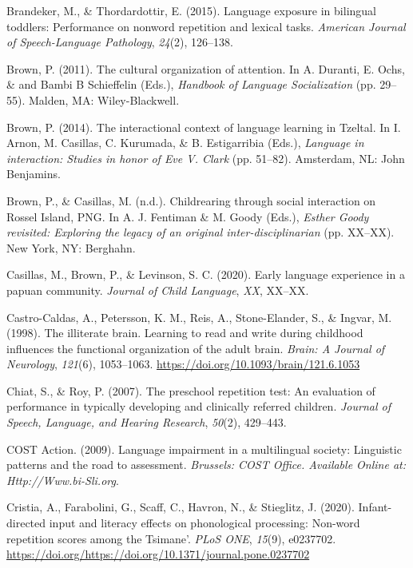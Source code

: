 \documentclass[english,,man,floatsintext]{apa6}
\begin{document}
\leavevmode\hypertarget{ref-brandeker2015language}{}%
Brandeker, M., \& Thordardottir, E. (2015). Language exposure in bilingual toddlers: Performance on nonword repetition and lexical tasks. \emph{American Journal of Speech-Language Pathology}, \emph{24}(2), 126--138.

\leavevmode\hypertarget{ref-brown2011cultural}{}%
Brown, P. (2011). The cultural organization of attention. In A. Duranti, E. Ochs, \& and Bambi B Schieffelin (Eds.), \emph{Handbook of Language Socialization} (pp. 29--55). Malden, MA: Wiley-Blackwell.

\leavevmode\hypertarget{ref-brown2014interactional}{}%
Brown, P. (2014). The interactional context of language learning in Tzeltal. In I. Arnon, M. Casillas, C. Kurumada, \& B. Estigarribia (Eds.), \emph{Language in interaction: Studies in honor of Eve V. Clark} (pp. 51--82). Amsterdam, NL: John Benjamins.

\leavevmode\hypertarget{ref-brownIPchildrearing}{}%
Brown, P., \& Casillas, M. (n.d.). Childrearing through social interaction on Rossel Island, PNG. In A. J. Fentiman \& M. Goody (Eds.), \emph{Esther Goody revisited: Exploring the legacy of an original inter-disciplinarian} (pp. XX--XX). New York, NY: Berghahn.

\leavevmode\hypertarget{ref-casillas2020early}{}%
Casillas, M., Brown, P., \& Levinson, S. C. (2020). Early language experience in a papuan community. \emph{Journal of Child Language}, \emph{XX}, XX--XX.

\leavevmode\hypertarget{ref-castro1998illiterate}{}%
Castro-Caldas, A., Petersson, K. M., Reis, A., Stone-Elander, S., \& Ingvar, M. (1998). The illiterate brain. Learning to read and write during childhood influences the functional organization of the adult brain. \emph{Brain: A Journal of Neurology}, \emph{121}(6), 1053--1063. \url{https://doi.org/10.1093/brain/121.6.1053}

\leavevmode\hypertarget{ref-chiat2007preschool}{}%
Chiat, S., \& Roy, P. (2007). The preschool repetition test: An evaluation of performance in typically developing and clinically referred children. \emph{Journal of Speech, Language, and Hearing Research}, \emph{50}(2), 429--443.

\leavevmode\hypertarget{ref-is08042009language}{}%
COST Action. (2009). Language impairment in a multilingual society: Linguistic patterns and the road to assessment. \emph{Brussels: COST Office. Available Online at: Http://Www.bi-Sli.org}.

\leavevmode\hypertarget{ref-cristia2020infant}{}%
Cristia, A., Farabolini, G., Scaff, C., Havron, N., \& Stieglitz, J. (2020). Infant-directed input and literacy effects on phonological processing: Non-word repetition scores among the Tsimane'. \emph{PLoS ONE}, \emph{15}(9), e0237702. \url{https://doi.org/https://doi.org/10.1371/journal.pone.0237702}
\end{document}
